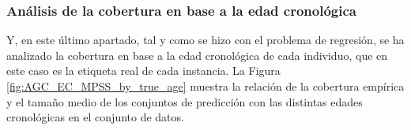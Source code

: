 
\subsubsection{Análisis de la cobertura en base a la edad cronológica}

Y, en este último apartado, tal y como se hizo con el problema de regresión, se ha analizado la cobertura en base a la edad cronológica de cada individuo, que en este caso es la etiqueta real de cada instancia. 
La Figura \ref{fig:AGC_EC_MPSS_by_true_age} muestra la relación de la cobertura empírica y el tamaño medio de los conjuntos de predicción con las distintas edades cronológicas en el conjunto de datos. 

